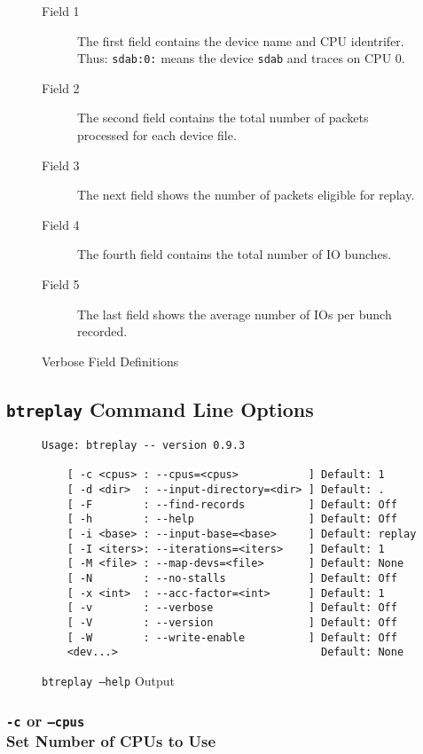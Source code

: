 \documentclass{article}
\begin{document}
\begin{figure}[h!]
\begin{description}
  \item[Field 1] The first field contains the device name and CPU
  identrifer. Thus: \texttt{sdab:0:} means the device \texttt{sdab} and
  traces on CPU 0. 

  \item[Field 2] The second field contains the total number of packets
  processed for each device file. 

  \item[Field 3] The next field shows the number of packets eligible for
  replay. 

  \item[Field 4] The fourth field contains the total number of IO bunches. 

  \item[Field 5] The last field shows the average number of IOs per bunch
  recorded.
\end{description}
\caption{\label{fig:verb-defs}Verbose Field Definitions}
\end{figure}
\FloatBarrier

\newpage\subsection{\texttt{btreplay} Command Line Options}
\begin{figure}[h!]
\begin{verbatim}
Usage: btreplay -- version 0.9.3

	[ -c <cpus> : --cpus=<cpus>           ] Default: 1
	[ -d <dir>  : --input-directory=<dir> ] Default: .
	[ -F        : --find-records          ] Default: Off
	[ -h        : --help                  ] Default: Off
	[ -i <base> : --input-base=<base>     ] Default: replay
	[ -I <iters>: --iterations=<iters>    ] Default: 1
	[ -M <file> : --map-devs=<file>       ] Default: None
	[ -N        : --no-stalls             ] Default: Off
	[ -x <int>  : --acc-factor=<int>      ] Default: 1
	[ -v        : --verbose               ] Default: Off
	[ -V        : --version               ] Default: Off
	[ -W        : --write-enable          ] Default: Off
	<dev...>                                Default: None
\end{verbatim}
\caption{\label{fig:btreplay--help}\texttt{btreplay --help} Output}
\end{figure}
\FloatBarrier

\subsubsection{\label{sec:p-o-c}\texttt{-c} or
\texttt{--cpus}\\Set Number of CPUs to Use}
\end{document}
